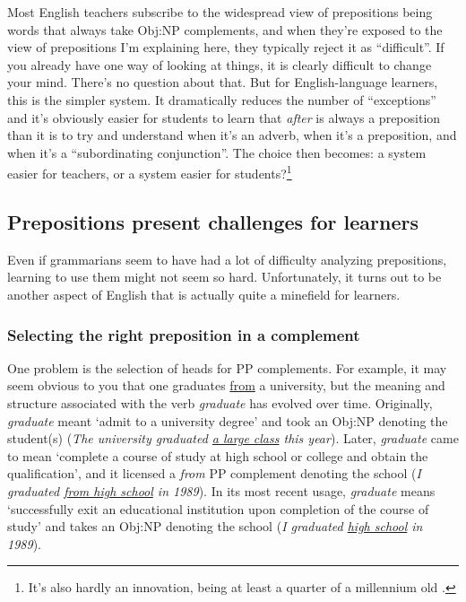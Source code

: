 Most English teachers subscribe to the widespread view of prepositions being words that always take Obj:NP complements, and when they're exposed to the view of prepositions I'm explaining here, they typically reject it as ``difficult''. If you already have one way of looking at things, it is clearly difficult to change your mind. There's no question about that. But for English-language learners, this is the simpler system. It dramatically reduces the number of ``exceptions'' and it's obviously easier for students to learn that \textit{after} is always a preposition than it is to try and understand when it's an adverb, when it's a preposition, and when it's a ``subordinating conjunction''. The choice then becomes: a system easier for teachers, or a system easier for students?\footnote{It's also hardly an innovation, being at least a quarter of a millennium old \citep{Hunter1784}.}

\subsection{Prepositions present challenges for learners}

Even if grammarians seem to have had a lot of difficulty analyzing prepositions,
learning to use them might not seem so hard. Unfortunately, it turns out to be
another aspect of English that is actually quite a minefield for learners.

\subsubsection*{Selecting the right preposition in a complement}

One problem is the selection of heads for PP complements. For example, it may
seem obvious to you that one graduates \uline{from} a university, but the meaning and
structure associated with the verb \textit{graduate} has evolved over time. Originally,
\textit{graduate} meant `admit to a university degree' and took an Obj:NP denoting the
student(s) (\textit{The university graduated \uline{a large class} this year}). Later, \textit{graduate} came
to mean `complete a course of study at high school or college and obtain the qualification', and it licensed a \textit{from} PP complement denoting the school (\textit{I graduated
\uline{from high school} in 1989}). In its most recent usage, \textit{graduate} means `successfully
exit an educational institution upon completion of the course of study' and takes
an Obj:NP denoting the school (\textit{I graduated \uline{high school} in 1989}).

